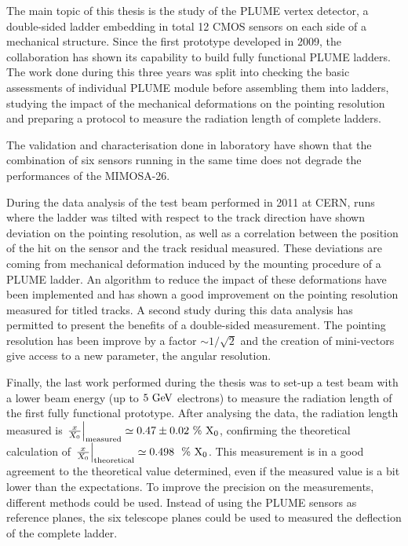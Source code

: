 The main topic of this thesis is the study of the \gls{PLUME} vertex detector, a double-sided ladder embedding in total 12 \gls{CMOS} sensors on each side of a mechanical structure.
Since the first prototype developed in 2009, the collaboration has shown its capability to build fully functional \gls{PLUME} ladders.
The work done during this three years was split into checking the basic assessments of individual \gls{PLUME} module before assembling them into ladders, studying the impact of the mechanical deformations on the pointing resolution and preparing a protocol to measure the radiation length of complete ladders.

The validation and characterisation done in laboratory have shown that the combination of six sensors running in the same time does not degrade the performances of the \gls{MIMOSA}-26.

During the data analysis of the test beam performed in 2011 at \gls{CERN}, runs where the ladder was tilted with respect to the track direction have shown deviation on the pointing resolution, as well as a correlation between the position of the hit on the sensor and the track residual measured.
These deviations are coming from mechanical deformation induced by the mounting procedure of a \gls{PLUME} ladder.
An algorithm to reduce the impact of these deformations have been implemented and has shown a good improvement on the pointing resolution measured for titled tracks.
A second study during this data analysis has permitted to present the benefits of a double-sided measurement. 
The pointing resolution has been improve by a factor $\sim 1/\sqrt{2}$ and the creation of mini-vectors give access to a new parameter, the angular resolution.

Finally, the last work performed during the thesis was to set-up a test beam with a lower beam energy (up to $5~\rm{GeV}$ electrons) to measure the radiation length of the first fully functional prototype.
After analysing the data, the radiation length measured is $\left. \frac{x}{X_0} \right|_{\rm{measured}} \simeq 0.47 \pm 0.02~\%~\rm{X_0}$, confirming the theoretical calculation of $\left. \frac{x}{X_0}\right|_{\rm{theoretical}} \simeq 0.498~~\%~\rm{X_0}$.
This measurement is in a good agreement to the theoretical value determined, even if the measured value is a bit lower than the expectations. 
To improve the precision on the measurements, different methods could be used.
Instead of using the \gls{PLUME} sensors as reference planes, the six telescope planes could be used to measured the deflection of the complete ladder.

